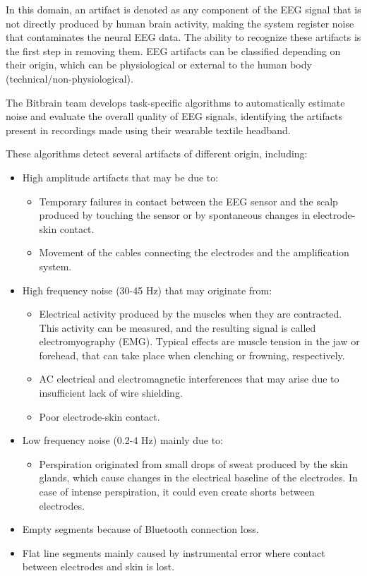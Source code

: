 In this domain, an artifact is denoted as any component of the EEG signal that is not directly produced by human brain activity, making the system register noise that contaminates the neural EEG data.  
The ability to recognize these artifacts is the first step in removing them. EEG artifacts can be classified depending on their origin, which can be physiological or external to the human body (technical/non-physiological).  

The Bitbrain team develops task-specific algorithms to automatically estimate noise and evaluate the overall quality of EEG signals, identifying the artifacts present in recordings made using their wearable textile headband. 

These algorithms detect several artifacts of different origin, including: 
\begin{itemize}
    \item High amplitude artifacts that may be due to: \begin{itemize}
        \item Temporary failures in contact between the EEG sensor and the scalp produced by touching the sensor or by spontaneous changes in electrode-skin contact. 
        \item Movement of the cables connecting the electrodes and the amplification system. 
    \end{itemize}
    \vspace{-0.2cm}
    \item High frequency noise (30-45 Hz) that may originate from: \begin{itemize}
        \item Electrical activity produced by the muscles when they are contracted. This activity can be measured, and the resulting signal is called electromyography (EMG). Typical effects are muscle tension in the jaw or forehead, that can take place when clenching or frowning, respectively. 
        \item AC electrical and electromagnetic interferences that may arise due to insufficient lack of wire shielding.
        \item Poor electrode-skin contact. 
    \end{itemize}
    \vspace{-0.2cm}
    \item Low frequency noise (0.2-4 Hz) mainly due to: \begin{itemize}
        \item Perspiration originated from small drops of sweat produced by the skin glands, which cause changes in the electrical baseline of the electrodes. In case of intense perspiration, it could even create shorts between electrodes. 
    \end{itemize}
    \vspace{-0.2cm}
    \item Empty segments because of Bluetooth connection loss. 
    \vspace{-0.2cm}
    \item Flat line segments mainly caused by instrumental error where contact between electrodes and skin is lost. 
\end{itemize}
